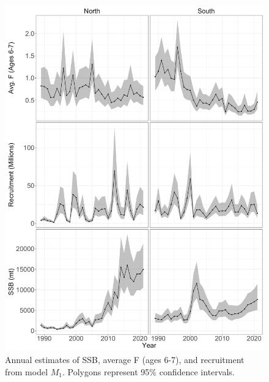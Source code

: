 \documentclass[
]{article}
\begin{document}
\begin{figure}

{\centering \includegraphics[height=0.95\textheight]{M_1_SSB_F_R} 

}

\caption{Annual estimates of SSB, average F (ages 6-7), and recruitment from model $M_1$. Polygons represent 95\% confidence intervals.}\label{fig:M1-SSB-F-R}
\end{figure}
\pagebreak
\end{document}
